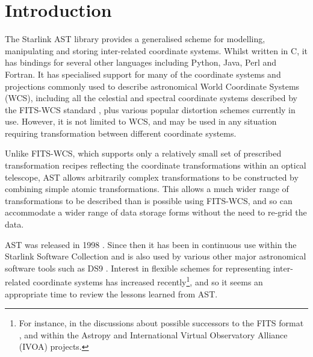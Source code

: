 \documentclass[final,authoryear,5p,times,twocolumn]{elsarticle}
\begin{document}

\newcommand{\mnras}{Mon Not R Astron Soc}
\newcommand{\aap}{Astron Astrophys}
\newcommand{\aaps}{Astron Astrophys Supp}
\newcommand{\pasp}{Pub Astron Soc Pacific}
\newcommand{\apj}{Astrophys J}
\newcommand{\apjs}{Astrophys J Supp}
\newcommand{\qjras}{Quart J R Astron Soc}
\newcommand{\an}{Astron.\ Nach.}
\newcommand{\ijimw}{Int.\ J.\ Infrared \& Millimeter Waves}
\newcommand{\procspie}{Proc.\ SPIE}
\newcommand{\aspconf}{ASP Conf. Ser.}

\newcommand{\ascl}[1]{\href{http://www.ascl.net/#1}{ascl:#1}}

\section{Introduction}
\label{sec:intro}

The Starlink AST library \citep[][\ascl{1404.016}]{SUN211} provides a
generalised scheme for modelling, manipulating and storing inter-related
coordinate systems. Whilst written in C, it has bindings for several
other languages including Python, Java, Perl and Fortran. It has
specialised support for many of the coordinate systems and projections
commonly used to describe astronomical World Coordinate Systems (WCS),
including all the celestial and spectral coordinate systems described by
the FITS-WCS standard \citep{FITSWCSI,FITSWCSII,FITSWCSIII}, plus various
popular distortion schemes currently in use. However, it is not limited to
WCS, and may be used in any situation requiring transformation between
different coordinate systems.

Unlike FITS-WCS, which supports only a relatively small set of prescribed
transformation recipes reflecting the coordinate transformations within
an optical telescope, AST allows arbitrarily complex transformations to be
constructed by combining simple atomic transformations. This allows a much
wider range of transformations to be
described than is possible using FITS-WCS, and so can accommodate a wider
range of data storage forms without the need to re-grid the data.

AST was released in 1998 \cite[][included in ``Twenty Years of
ADASS'' \nocite{adass20}]{1998ASPC..145...41W}. Since then it has been in
continuous use within the Starlink Software Collection \citep[][\ascl{1110.012}]{2014ASPC..485..391C}
and is also used by various other major astronomical software tools such as
DS9 \citep[][\ascl{0003.002}]{2003ASPC..295..489J}. Interest in flexible schemes for representing
inter-related coordinate systems has increased recently\footnote{For
instance, in the discussions about possible successors to the FITS format \citep{2015Mink},
and within the Astropy \citep{2013A&A...558A..33A} and International
Virtual Observatory Alliance (IVOA) projects.}, and so it seems an appropriate time to
review the lessons learned from AST.
\end{document}
